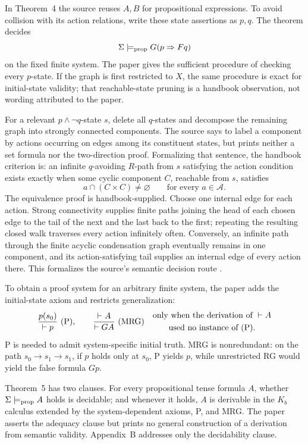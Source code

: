 In Theorem~4 the source reuses \(A,B\) for propositional expressions.  To avoid
collision with its action relations, write these state assertions as \(p,q\).
The theorem decides
\[
 \Sigma\models_{\rm prop}G(p\Rightarrow Fq)
\]
on the fixed finite system.  The paper gives the sufficient procedure of
checking every \(p\)-state.  If the graph is first restricted to \(X\), the
same procedure is exact for initial-state validity; that reachable-state
pruning is a handbook observation, not wording attributed to the paper.

For a relevant \(p\land\neg q\)-state \(s\), delete all \(q\)-states and
decompose the remaining graph into strongly connected components.  The source
says to label a component by actions occurring on edges among its constituent
states, but prints neither a set formula nor the two-direction proof.
Formalizing that sentence, the handbook criterion is: an infinite
\(q\)-avoiding \(R\)-path from \(s\) satisfying the action condition exists
exactly when some cyclic component \(C\), reachable from \(s\), satisfies
\[
 a\cap(C\times C)\ne\varnothing
 \qquad\text{for every }a\in\mathcal A.
\]
The equivalence proof is handbook-supplied.  Choose one internal edge for each
action.  Strong connectivity supplies finite paths joining the head of each
chosen edge to the tail of the next and the last back to the first; repeating
the resulting closed walk traverses every action infinitely often.  Conversely,
an infinite path through the finite acyclic condensation graph eventually
remains in one component, and its action-satisfying tail supplies an internal
edge of every action there.  This formalizes the source's semantic decision
route
\cite[p.~55]{Pnueli1977}.

To obtain a proof system for an arbitrary finite system, the paper adds the
initial-state axiom and restricts generalization:
\[
 \frac{p(s_0)}{\vdash p}\ ({\rm P}),
 \qquad
 \frac{\vdash A}{\vdash GA}\ ({\rm MRG})
 \quad
 \begin{gathered}
  \text{only when the derivation of }\vdash A\\
  \text{used no instance of }({\rm P}).
 \end{gathered}
\]
P is needed to admit system-specific initial truth.  MRG is nonredundant:
on the path \(s_0\to s_1\to s_1\), if \(p\) holds only at \(s_0\), P yields
\(p\), while unrestricted RG would yield the false formula \(Gp\).

Theorem~5 has two clauses.  For every propositional tense formula \(A\), whether
\(\Sigma\models_{\rm prop}A\) holds is decidable; and whenever it holds, \(A\)
is derivable in the \(K_b\) calculus extended by the system-dependent axioms,
P, and MRG.  The paper asserts the adequacy clause but prints no general
construction of a derivation from semantic validity.  Appendix~B addresses
only the decidability clause.

